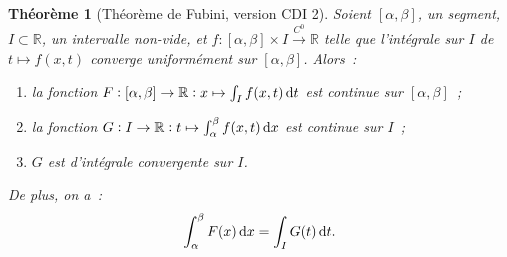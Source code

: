 \documentclass{report}
\newtheorem{thm}{Théorème}[chapter]
\theoremstyle{definition}
\theoremstyle{remark}
\numberwithin{equation}{section}
\newcommand{\R}{\mathbb R}
\newcommand{\toC}[1]{\xrightarrow{C^{#1}}}
\newcommand{\tocont}{\toC 0}
\newcommand{\CDIII}{{CDI 2}}
\begin{document}
			\begin{thm}[Théorème de Fubini, version \CDIII]\label{thm:FubiniCDI1} Soient $[\alpha, \beta]$, un segment, $I \subset \R$, un intervalle non-vide, et
			$f : [\alpha, \beta] \times I \tocont \R$ telle que l'intégrale sur $I$ de $t \mapsto f(x, t)$ converge uniformément sur $[\alpha, \beta]$. Alors~:
			\begin{enumerate}
				\item la fonction $F : [\alpha, \beta] \to \R : x \mapsto \int_I f(x, t)\dif t$ est continue sur $[\alpha, \beta]$~;
				\item la fonction $G : I \to \R : t \mapsto \int_\alpha^\beta f(x, t)\dif x$ est continue sur $I$~;
				\item $G$ est d'intégrale convergente sur $I$.
			\end{enumerate}

			De plus, on a~:
			\begin{equation}
				\int_\alpha^\beta F(x)\dif x = \int_I G(t)\dif t.
			\end{equation}
			\end{thm}
\end{document}
